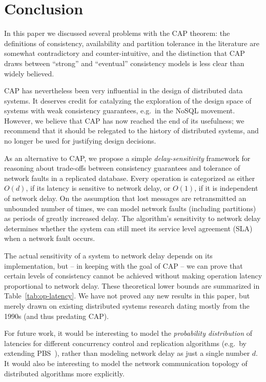 \documentclass[a4paper,twocolumn,10pt]{article}
\begin{document}
\section{Conclusion}

In this paper we discussed several problems with the CAP theorem: the definitions of consistency,
availability and partition tolerance in the literature are somewhat contradictory and
counter-intuitive, and the distinction that CAP draws between ``strong'' and ``eventual''
consistency models is less clear than widely believed.

CAP has nevertheless been very influential in the design of distributed data systems. It deserves
credit for catalyzing the exploration of the design space of systems with weak consistency
guarantees, e.g.\ in the NoSQL movement. However, we believe that CAP has now reached the end of its
usefulness; we recommend that it should be relegated to the history of distributed systems, and no
longer be used for justifying design decisions.

As an alternative to CAP, we propose a simple \emph{delay-sensitivity} framework for reasoning about
trade-offs between consistency guarantees and tolerance of network faults in a replicated database.
Every operation is categorized as either $O(d)$, if its latency is sensitive to network delay, or
$O(1)$, if it is independent of network delay. On the assumption that lost messages are
retransmitted an unbounded number of times, we can model network faults (including partitions) as
periods of greatly increased delay. The algorithm's sensitivity to network delay determines whether
the system can still meet its service level agreement (SLA) when a network fault occurs.

The actual sensitivity of a system to network delay depends on its implementation, but -- in keeping
with the goal of CAP -- we can prove that certain levels of consistency cannot be achieved without
making operation latency proportional to network delay. These theoretical lower bounds are
summarized in Table~\ref{tab:op-latency}. We have not proved any new results in this paper, but
merely drawn on existing distributed systems research dating mostly from the 1990s (and thus
predating CAP).

For future work, it would be interesting to model the \emph{probability distribution} of latencies
for different concurrency control and replication algorithms (e.g.\ by extending
PBS~\cite{Bailis2012to}), rather than modeling network delay as just a single number $d$. It would
also be interesting to model the network communication topology of distributed algorithms more
explicitly.
\end{document}
